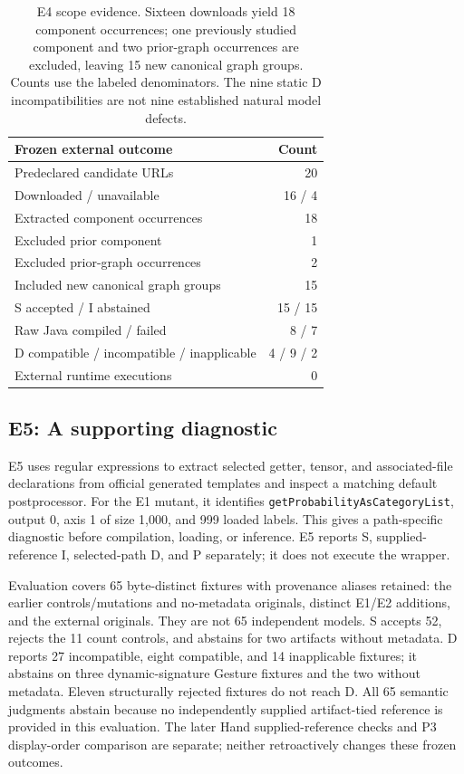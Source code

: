 \documentclass[10pt,twocolumn,letterpaper]{article}
\newcommand{\code}[1]{\texttt{#1}}
\begin{document}
\begin{table}[t]
\centering\small
\begin{tabular}{@{}lr@{}}
\toprule
Frozen external outcome & Count\\
\midrule
Predeclared candidate URLs & 20\\
Downloaded / unavailable & 16 / 4\\
Extracted component occurrences & 18\\
Excluded prior component & 1\\
Excluded prior-graph occurrences & 2\\
Included new canonical graph groups & 15\\
S accepted / I abstained & 15 / 15\\
Raw Java compiled / failed & 8 / 7\\
D compatible / incompatible / inapplicable & 4 / 9 / 2\\
External runtime executions & 0\\
\bottomrule
\end{tabular}
\caption{E4 scope evidence. Sixteen downloads yield 18 component occurrences; one previously studied component and two prior-graph occurrences are excluded, leaving 15 new canonical graph groups. Counts use the labeled denominators. The nine static D incompatibilities are not nine established natural model defects.}
\label{tab:external}
\end{table}

\subsection{E5: A supporting diagnostic}
E5 uses regular expressions to extract selected getter, tensor, and associated-file declarations from official generated templates and inspect a matching default postprocessor. For the E1 mutant, it identifies \code{getProbabilityAsCategoryList}, output 0, axis 1 of size 1,000, and 999 loaded labels. This gives a path-specific diagnostic before compilation, loading, or inference. E5 reports S, supplied-reference I, selected-path D, and P separately; it does not execute the wrapper.

Evaluation covers 65 byte-distinct fixtures with provenance aliases retained: the earlier controls/mutations and no-metadata originals, distinct E1/E2 additions, and the external originals. They are not 65 independent models. S accepts 52, rejects the 11 count controls, and abstains for two artifacts without metadata. D reports 27 incompatible, eight compatible, and 14 inapplicable fixtures; it abstains on three dynamic-signature Gesture fixtures and the two without metadata. Eleven structurally rejected fixtures do not reach D. All 65 semantic judgments abstain because no independently supplied artifact-tied reference is provided in this evaluation. The later Hand supplied-reference checks and P3 display-order comparison are separate; neither retroactively changes these frozen outcomes.
\end{document}
